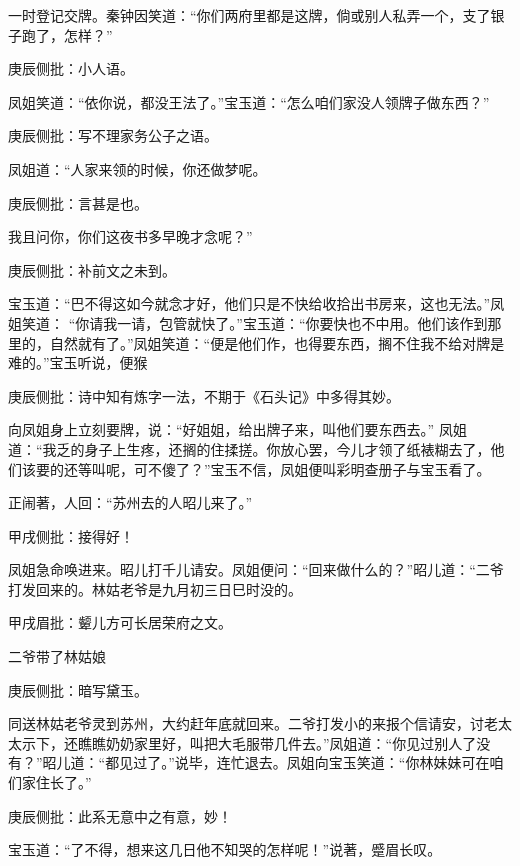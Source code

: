 \begin{parag}


    一时登记交牌。秦钟因笑道：“你们两府里都是这牌，倘或别人私弄一个，支了银子跑了，怎样？”\begin{note}庚辰侧批：小人语。\end{note}凤姐笑道：“依你说，都没王法了。”宝玉道：“怎么咱们家没人领牌子做东西？”\begin{note}庚辰侧批：写不理家务公子之语。\end{note}凤姐道：“人家来领的时候，你还做梦呢。\begin{note}庚辰侧批：言甚是也。\end{note}我且问你，你们这夜书多早晚才念呢？”\begin{note}庚辰侧批：补前文之未到。\end{note}宝玉道：“巴不得这如今就念才好，他们只是不快给收拾出书房来，这也无法。”凤姐笑道： “你请我一请，包管就快了。”宝玉道：“你要快也不中用。他们该作到那里的，自然就有了。”凤姐笑道：“便是他们作，也得要东西，搁不住我不给对牌是难的。”宝玉听说，便猴\begin{note}庚辰侧批：诗中知有炼字一法，不期于《石头记》中多得其妙。\end{note}向凤姐身上立刻要牌，说：“好姐姐，给出牌子来，叫他们要东西去。” 凤姐道：“我乏的身子上生疼，还搁的住揉搓。你放心罢，今儿才领了纸裱糊去了，他们该要的还等叫呢，可不傻了？”宝玉不信，凤姐便叫彩明查册子与宝玉看了。
\end{parag}


\begin{parag}


    正闹著，人回：“苏州去的人昭儿来了。”\begin{note}甲戌侧批：接得好！\end{note}凤姐急命唤进来。昭儿打千儿请安。凤姐便问：“回来做什么的？”昭儿道：“二爷打发回来的。林姑老爷是九月初三日巳时没的。\begin{note}甲戌眉批：颦儿方可长居荣府之文。\end{note}二爷带了林姑娘\begin{note}庚辰侧批：暗写黛玉。\end{note}同送林姑老爷灵到苏州，大约赶年底就回来。二爷打发小的来报个信请安，讨老太太示下，还瞧瞧奶奶家里好，叫把大毛服带几件去。”凤姐道：“你见过别人了没有？”昭儿道：“都见过了。”说毕，连忙退去。凤姐向宝玉笑道：“你林妹妹可在咱们家住长了。”\begin{note}庚辰侧批：此系无意中之有意，妙！\end{note}宝玉道：“了不得，想来这几日他不知哭的怎样呢！”说著，蹙眉长叹。
\end{parag}


